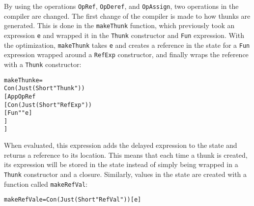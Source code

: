 By using the operations \texttt{OpRef}, \texttt{OpDeref}, and \texttt{OpAssign},
two operations in the compiler are changed. The first change of the compiler
is made to how thunks are generated. This is done in the
\texttt{makeThunk} function, which previously took an expression \texttt{e} and
wrapped it in the \texttt{Thunk} constructor and \texttt{Fun} expression. With
the optimization, \texttt{makeThunk}
takes \texttt{e} and creates a reference in the state for a \texttt{Fun}
expression wrapped around a \texttt{RefExp} constructor, and finally wraps
the reference with a \texttt{Thunk} constructor:
\begin{alltt}
  makeThunk e =
    Con (Just (Short "Thunk"))
      [App OpRef
        [Con (Just (Short "RefExp"))
          [Fun "" e]
        ]
      ]
\end{alltt}
When evaluated, this expression adds the delayed expression to the state and
returns a reference to its location. This means that each time a thunk is
created, its expression will be stored in the state instead of simply being wrapped in a
\texttt{Thunk} constructor and a closure. Similarly, values in the state are
created with a function called \texttt{makeRefVal}:
\begin{alltt}
  makeRefVal e = Con (Just (Short "RefVal")) [e]
\end{alltt}

